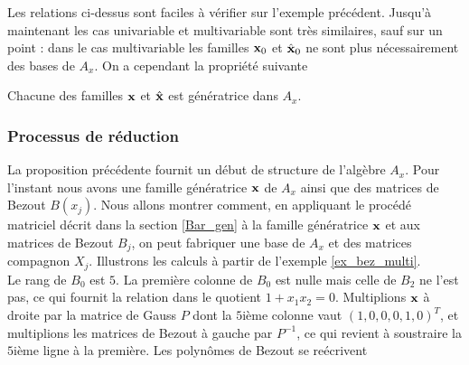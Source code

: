 \documentclass{standalone}
\begin{document}
  Les relations ci-dessus sont faciles à vérifier sur l'exemple précédent. Jusqu'à maintenant les cas univariable et multivariable sont très similaires, sauf sur un point : dans le cas multivariable les familles $\bold{x}_0$ et $\hat{\bold{x}}_0$ ne sont plus nécessairement des bases de $A_x$. On a cependant la propriété suivante

  \begin{prop}
  Chacune des familles $\bold{x}$ et $\hat{\bold{x}}$ est génératrice dans $A_x$.
  \end{prop}





  \subsubsection{Processus de réduction}
  La proposition précédente fournit un début de structure de l'algèbre $A_x$. Pour l'instant nous avons une famille génératrice $\bold{x}$ de $A_x$ ainsi que des matrices de Bezout $B(x_j)$.
  Nous allons montrer comment, en appliquant le procédé matriciel décrit dans la section \ref{Bar_gen} à la famille génératrice $\bold{x}$ et aux matrices de Bezout $B_j$, on peut fabriquer une base de $A_x$ et des matrices compagnon $X_j$.
  Illustrons les calculs à partir de l'exemple \ref{ex_bez_multi}.\\
  Le rang de $B_0$ est $5$. La première colonne de $B_0$ est nulle mais celle de $B_2$ ne l'est pas, ce qui fournit la relation dans le quotient $1 + x_1x_2 = 0$.
  Multiplions $\bold{x}$ à droite par la matrice de Gauss $P$ dont la $5$ième colonne vaut $(1, 0, 0, 0, 1, 0)^{T}$, et multiplions les matrices de Bezout à gauche par $P^{-1}$, ce qui revient à soustraire la $5$ième ligne à la première.
  Les polynômes de Bezout se reécrivent\\
\end{document}
